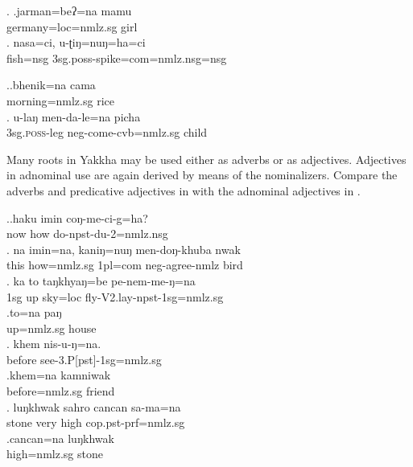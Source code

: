 \ex. \ag.jarman=beʔ=na mamu\\ 
	germany{\sc =loc=nmlz.sg} girl		\\ 
	\bg. nasa=ci, u-ʈiŋ=nuŋ=ha=ci\\
		fish{\sc =nsg}	{\sc 3sg.poss-}spike{\sc =com=nmlz.nsg=nsg}\\
			 
			
		
			
 	\ex.\ag.bhenik=na cama\\
	morning{\sc =nmlz.sg} rice\\
	 \bg. u-laŋ men-da-le=na picha\\ 
	{\sc 3sg.\textsc{poss}}-leg {\sc neg-}come-{\sc cvb=nmlz.sg} child\\ 

	
Many roots in Yakkha may be used either as adverbs or as adjectives. Adjectives in adnominal use are again derived by means of the nominalizers. Compare the adverbs and predicative adjectives in \Next[a, c, e, g]  with the adnominal adjectives in \Next[b, d, f, h].
	
 

\ex.\ag.haku imin coŋ-me-ci-g=ha?\\
	now how do{\sc -npst-du-2=nmlz.nsg}{\sc }{\sc }	\\
	 
 	\bg. na  imin=na,        kaniŋ=nuŋ   men-doŋ-khuba     nwak\\
	this how{\sc =nmlz.sg} {\sc 1pl=com} {\sc neg}-agree-{\sc nmlz} bird		\\
	 
	\bg. ka to taŋkhyaŋ=be   pe-nem-me-ŋ=na\\ 
	{\sc 1sg} up sky{\sc =loc} fly-{\sc V2.lay-npst-1sg=nmlz.sg}		\\ 
	 
	\bg.to=na paŋ\\
	up{\sc =nmlz.sg} house		\\
	 \bg. khem nis-u-ŋ=na.\\ 
	before see-{\sc 3.P[pst]-1sg=nmlz.sg}		\\ 
	\bg.khem=na  kamniwak\\
	before{\sc =nmlz.sg}  friend\\
	\bg.  luŋkhwak sahro cancan sa-ma=na\\
	stone very high {\sc cop.pst-prf=nmlz.sg}	\\
	 
 	\bg.cancan=na luŋkhwak\\
	high{\sc =nmlz.sg} stone\\


